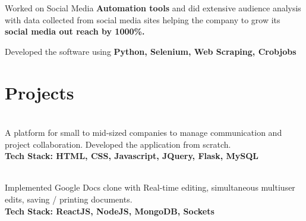 \documentclass[]{ishaan-kamra-resume}
\begin{document}
\begin{minipage}[t]{0.66\textwidth}
    \begin{tightemize}
        \item Worked on Social Media \textbf{Automation tools} and did extensive audience analysis with data collected from social media sites helping the company to grow its \textbf{social media out reach by 1000\%.}
        \item Developed the software using \textbf{Python, Selenium, Web Scraping, Crobjobs}
    \end{tightemize}
    \sectionsep


    \section{Projects}
     \\
    A platform for small to mid-sized companies to manage communication and project collaboration. Developed the application from scratch. \\
    \textbf{Tech Stack: HTML, CSS, Javascript, JQuery, Flask, MySQL}
    \sectionsep

     \\
    Implemented Google Docs clone with Real-time editing, simultaneous multiuser edits, saving / printing documents. \\
    \textbf{Tech Stack: ReactJS, NodeJS, MongoDB, Sockets}
    \sectionsep



\end{minipage}
\end{document}

